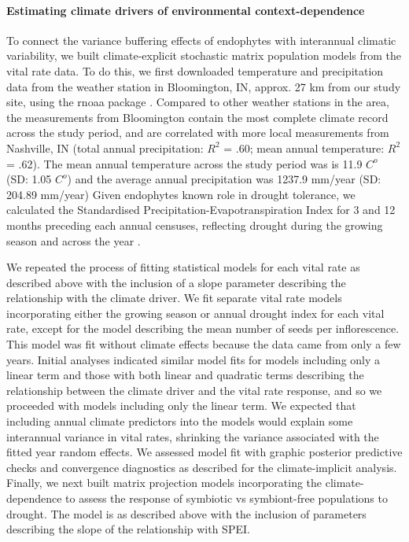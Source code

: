 \documentclass[12pt]{article}
\begin{document}
\paragraph*{Estimating climate drivers of environmental context-dependence}
To connect the variance buffering effects of endophytes with interannual climatic variability, we built climate-explicit stochastic matrix population models from the vital rate data.
To do this, we first downloaded temperature and precipitation data from the weather station in Bloomington, IN,  approx. 27 km from our study site, using the rnoaa package \cite{chamberlain2022package}. 
Compared to other weather stations in the area, the measurements from Bloomington contain the most complete climate record across the study period, and are correlated with more local measurements from Nashville, IN (total annual precipitation: $R^2$ = .60; mean annual temperature: $R^2$ = .62).
The mean annual temperature across the study period was is 11.9 $C^o $ (SD: 1.05 $C^o $) and the average annual precipitation was 1237.9 mm/year (SD: 204.89 mm/year)
Given endophytes known role in drought tolerance, we calculated the Standardised Precipitation-Evapotranspiration Index for 3 and 12 months preceding each annual censuses, reflecting drought during the growing season and across the year \cite{vicente2010multiscalar}.

We repeated the process of fitting statistical models for each vital rate as described above with the inclusion of a slope parameter describing the relationship with the climate driver. 
We fit separate vital rate models incorporating either the growing season or annual drought index for each vital rate, except for the model describing the mean number of seeds per inflorescence. 
This model was fit without climate effects because the data came from only a few years.
Initial analyses indicated similar model fits for models including only a linear term and those with both linear and  quadratic terms describing the relationship between the climate driver and the vital rate response, and so we proceeded with models including only the linear term.
We expected that including annual climate predictors into the models would explain some interannual variance in vital rates, shrinking the variance associated with the fitted year random effects.
We assessed model fit with graphic posterior predictive checks and convergence diagnostics as described for the climate-implicit analysis. 
Finally, we next built matrix projection models incorporating the climate-dependence to assess the response of symbiotic vs symbiont-free populations to drought. 
The model is as described above with the inclusion of parameters describing the slope of the relationship with SPEI. 
\end{document}
